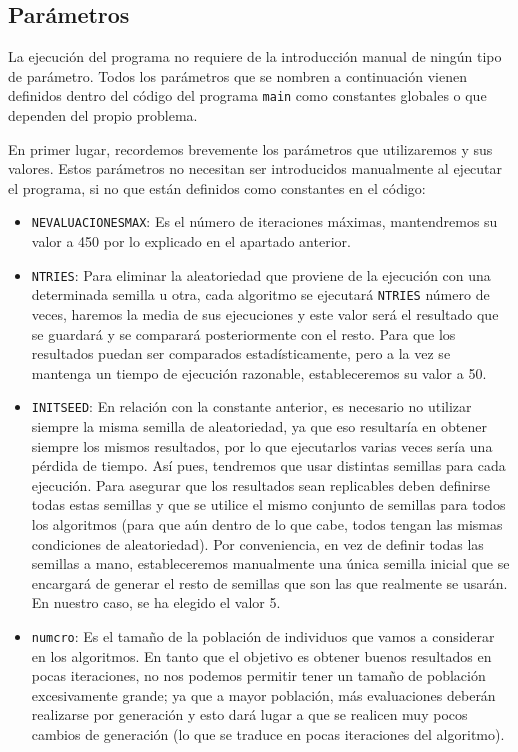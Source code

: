 \subsection{Parámetros}

La ejecución del programa no requiere de la introducción manual de ningún tipo de parámetro. 
Todos los parámetros que se nombren a continuación vienen definidos dentro del código del programa \texttt{main} como constantes globales o que dependen del propio problema. 

En primer lugar, recordemos brevemente los parámetros que utilizaremos y sus valores. 
Estos parámetros no necesitan ser introducidos manualmente al ejecutar el programa, si no que están definidos como constantes en el código:

\begin{itemize}
	\item \texttt{NEVALUACIONESMAX}: Es el número de iteraciones máximas, mantendremos su valor a 450 por lo explicado en el apartado anterior. 
	\item \texttt{NTRIES}: Para eliminar la aleatoriedad que proviene de la ejecución con una determinada semilla u otra, cada algoritmo se ejecutará \texttt{NTRIES} número de veces, haremos la media de sus ejecuciones y este valor será el resultado que se guardará y se comparará posteriormente con el resto. 
	Para que los resultados puedan ser comparados estadísticamente, pero a la vez se mantenga un tiempo de ejecución razonable, estableceremos su valor a 50.
	\item \texttt{INITSEED}: En relación con la constante anterior, es necesario no utilizar siempre la misma semilla de aleatoriedad, ya que eso resultaría en obtener siempre los mismos resultados, por lo que ejecutarlos varias veces sería una pérdida de tiempo. 
	Así pues, tendremos que usar distintas semillas para cada ejecución. 
	Para asegurar que los resultados sean replicables deben definirse todas estas semillas y que se utilice el mismo conjunto de semillas para todos los algoritmos (para que aún dentro de lo que cabe, todos tengan las mismas condiciones de aleatoriedad). 
	Por conveniencia, en vez de definir todas las semillas a mano, estableceremos manualmente una única semilla inicial que se encargará de generar el resto de semillas que son las que realmente se usarán.
	En nuestro caso, se ha elegido el valor 5. 
	\item \texttt{numcro}: Es el tamaño de la población de individuos que vamos a considerar en los algoritmos. 
	En tanto que el objetivo es obtener buenos resultados en pocas iteraciones, no nos podemos permitir tener un tamaño de población excesivamente grande; ya que a mayor población, más evaluaciones deberán realizarse por generación y esto dará lugar a que se realicen muy pocos cambios de generación (lo que se traduce en pocas iteraciones del algoritmo). 

\end{itemize}
